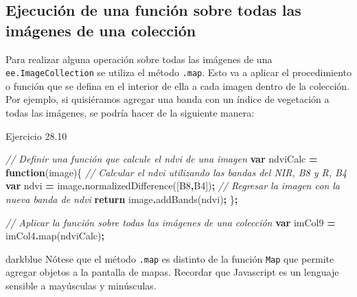 \documentclass[
  12pt,
  letterpaper,
  twoside]{book}
\newenvironment{Shaded}{\begin{snugshade}}{\end{snugshade}}
\newcommand{\CommentTok}[1]{\textcolor[rgb]{0.56,0.35,0.01}{\textit{#1}}}
\newcommand{\ControlFlowTok}[1]{\textcolor[rgb]{0.13,0.29,0.53}{\textbf{#1}}}
\newcommand{\FunctionTok}[1]{\textcolor[rgb]{0.00,0.00,0.00}{#1}}
\newcommand{\KeywordTok}[1]{\textcolor[rgb]{0.13,0.29,0.53}{\textbf{#1}}}
\newcommand{\NormalTok}[1]{#1}
\newcommand{\OperatorTok}[1]{\textcolor[rgb]{0.81,0.36,0.00}{\textbf{#1}}}
\newcommand{\StringTok}[1]{\textcolor[rgb]{0.31,0.60,0.02}{#1}}
\begin{document}
\hypertarget{ejecuciuxf3n-de-una-funciuxf3n-sobre-todas-las-imuxe1genes-de-una-colecciuxf3n}{%
\subsection{Ejecución de una función sobre todas las imágenes de una colección}\label{ejecuciuxf3n-de-una-funciuxf3n-sobre-todas-las-imuxe1genes-de-una-colecciuxf3n}}

Para realizar alguna operación sobre todas las imágenes de una \texttt{ee.ImageCollection} se utiliza el método \texttt{.map}. Esto va a aplicar el procedimiento o función que se defina en el interior de ella a cada imagen dentro de la colección. Por ejemplo, si quisiéramos agregar una banda con un índice de vegetación a todas las imágenes, se podría hacer de la siguiente manera:

Ejercicio 28.10

\begin{Shaded}
\begin{Highlighting}[]
\CommentTok{// Definir una función que calcule el ndvi de una imagen}
\KeywordTok{var}\NormalTok{ ndviCalc }\OperatorTok{=} \KeywordTok{function}\NormalTok{(image)\{}
  \CommentTok{// Calcular el ndvi utilizando las bandas del NIR, B8 y R, B4}
  \KeywordTok{var}\NormalTok{ ndvi }\OperatorTok{=}\NormalTok{ image}\OperatorTok{.}\FunctionTok{normalizedDifference}\NormalTok{([}\StringTok{\textquotesingle{}B8\textquotesingle{}}\OperatorTok{,}\StringTok{\textquotesingle{}B4\textquotesingle{}}\NormalTok{])}\OperatorTok{;}
  \CommentTok{// Regresar la imagen con la nueva banda de ndvi}
  \ControlFlowTok{return}\NormalTok{ image}\OperatorTok{.}\FunctionTok{addBands}\NormalTok{(ndvi)}\OperatorTok{;}
\NormalTok{\}}\OperatorTok{;}

\CommentTok{// Aplicar la función sobre todas las imágenes de una colección}
\KeywordTok{var}\NormalTok{ imCol9 }\OperatorTok{=}\NormalTok{ imCol4}\OperatorTok{.}\FunctionTok{map}\NormalTok{(ndviCalc)}\OperatorTok{;}
\end{Highlighting}
\end{Shaded}

\begin{bluebox2}

\begin{awesomeblock}{5pt}{\faLightbulb}{darkblue}
Nótese que el método \texttt{.map} es distinto de la función \texttt{Map} que permite agregar objetos a la pantalla de mapas. Recordar que Javascript es un lenguaje sensible a mayúsculas y minúsculas.

\end{awesomeblock}

\end{bluebox2}
\end{document}

